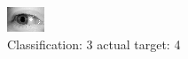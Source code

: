 \begin{figure}[h!]
\begin{center}
\includegraphics[width=0.60\columnwidth]{figures/ID3271_class_3_target_4.png}
\end{center}
\caption{ Classification: 3 actual target: 4}
\label{fig:ID3271_class_3_target_4}
\end{figure}
